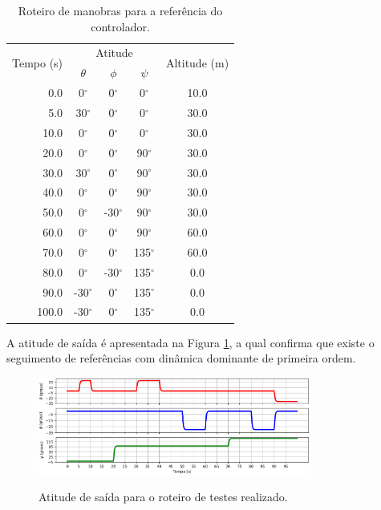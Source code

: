 \documentclass[main.tex]{subfiles}
\begin{document}
\begin{table}[!h]
    \centering
    \caption{Roteiro de manobras para a referência do controlador.}
    \begin{tabular}{|r|c|c|c|c|}
        \hline
        \multirow{2}{*}{Tempo (s)} &  \multicolumn{3}{c|}{Atitude} & \multirow{2}{*}{Altitude (m)}\\\cline{2-4}
        & $\theta$ & $\phi$ & $\psi$ & \\\hline
        0.0 & 0$^\circ$     &   0$^\circ$&   0$^\circ$& 10.0\\\hline
        5.0 & 30$^\circ$    &   0$^\circ$&   0$^\circ$& 30.0\\\hline
        10.0& 0$^\circ$     &   0$^\circ$&   0$^\circ$& 30.0\\\hline
        20.0& 0$^\circ$     &   0$^\circ$&  90$^\circ$& 30.0\\\hline
        30.0& 30$^\circ$    &   0$^\circ$&  90$^\circ$& 30.0\\\hline
        40.0& 0$^\circ$     &   0$^\circ$&  90$^\circ$& 30.0\\\hline
        50.0& 0$^\circ$     & -30$^\circ$&  90$^\circ$& 30.0\\\hline
        60.0& 0$^\circ$     &   0$^\circ$&  90$^\circ$& 60.0\\\hline
        70.0& 0$^\circ$     &   0$^\circ$& 135$^\circ$& 60.0\\\hline
        80.0& 0$^\circ$     & -30$^\circ$& 135$^\circ$& 0.0\\\hline
        90.0& -30$^\circ$   &   0$^\circ$& 135$^\circ$& 0.0\\\hline
        100.0& -30$^\circ$  &   0$^\circ$& 135$^\circ$& 0.0\\\hline
    \end{tabular}
    \label{tab:roteiro}
\end{table}

A atitude de saída é apresentada na Figura \ref{fig:teste_atitude}, a qual confirma que existe o seguimento de referências com dinâmica dominante de primeira ordem.

\begin{figure}[!h]
    \centering
    \caption{Atitude de saída para o roteiro de testes realizado.}
    \includegraphics[width=0.8\textwidth]{capitulos/controle_atitude/imgs/teste_atitude.png}
    \label{fig:teste_atitude}
\end{figure}
\end{document}

